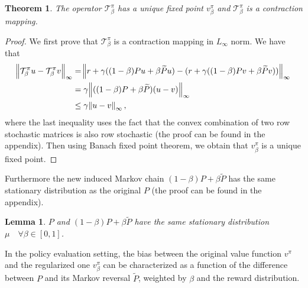 \documentclass{article}
\newtheorem{theorem}{Theorem}
\newtheorem{lemma}{Lemma}
\newcommand{\param}{\beta}
\newcommand{\pol}{\pi}
\newcommand{\T}{\mathcal{T}}
\newcommand{\V}{v}
\newcommand{\Vr}{\V_{\param}}
\newcommand{\regT}{\T^{\pol}_{\param}}
\begin{document}
\begin{theorem}
The operator $\regT$ has a unique fixed point $\Vr^{\pol}$ and $\regT$ is a contraction mapping.
\end{theorem}
\begin{proof}
We first prove that $\regT$ is a contraction mapping in $L_\infty$ norm. We have that
\begin{equation}
\begin{split}
    \norm{\regT u - \regT v}_{\infty} &= \norm{r+\gamma( (1-\param) Pu + \param \widetilde{P}u) - (r+\gamma( (1-\param) Pv + \param \widetilde{P}v))}_{\infty}\\
    &= \gamma \norm{((1-\param) P + \param \widetilde{P})(u-v)}_{\infty}\\
    &\leq \gamma \norm{u-v}_{\infty},
\end{split}
\end{equation}
where the last inequality uses the fact that the convex combination of two row stochastic matrices is also row stochastic (the proof can be found in the appendix).
Then using Banach fixed point theorem, we obtain that $\Vr^{\pol}$ is a unique fixed point. 
\end{proof}
Furthermore the new induced Markov chain $(1-\param) P + \param \widetilde{P}$ has the same stationary distribution as the original $P$ (the proof can be found in the appendix).
\begin{lemma}
\label{cor:same_stationary_dist}
$P$ and $(1-\param) P + \param \widetilde{P}$ have the same stationary distribution $\mu \quad \forall \param \in [0,1]$.
\end{lemma}


In the policy evaluation setting, the bias between the original value function $\V^{\pol}$ and the regularized one $\V^{\pol}_{\param}$ can be characterized as a function of the difference between $P$ and its Markov reversal $\widetilde{P}$, weighted by $\param$ and the reward distribution.
\end{document}

